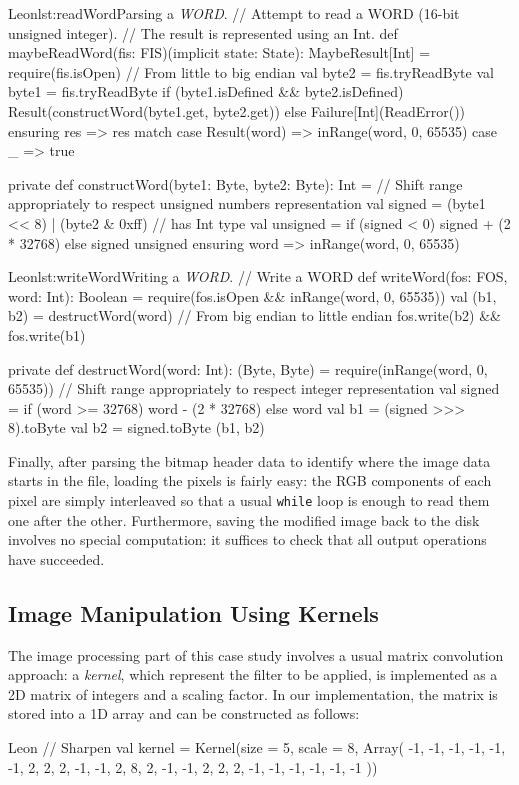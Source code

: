 \documentclass[a4paper,twoside]{article}
\newcommand{\InlineS}[1]{\lstinline[language=Leon]|#1|}
\begin{document}
\begin{Code}{Leon}{lst:readWord}{Parsing a \emph{WORD}.}
// Attempt to read a WORD (16-bit unsigned integer).
// The result is represented using an Int.
def maybeReadWord(fis: FIS)(implicit state: State): MaybeResult[Int] = {
  require(fis.isOpen)
  // From little to big endian
  val byte2 = fis.tryReadByte
  val byte1 = fis.tryReadByte
  if (byte1.isDefined && byte2.isDefined)
    Result(constructWord(byte1.get, byte2.get))
  else
    Failure[Int](ReadError())
} ensuring { res =>
  res match {
    case Result(word) => inRange(word, 0, 65535)
    case _            => true
  }
}

private def constructWord(byte1: Byte, byte2: Byte): Int = {
  // Shift range appropriately to respect unsigned numbers representation
  val signed   = (byte1 << 8) | (byte2 & 0xff) // has Int type
  val unsigned = if (signed < 0) signed + (2 * 32768) else signed
  unsigned
} ensuring { word => inRange(word, 0, 65535) }
\end{Code}

\begin{Code}{Leon}{lst:writeWord}{Writing a \emph{WORD}.}
// Write a WORD
def writeWord(fos: FOS, word: Int): Boolean = {
  require(fos.isOpen && inRange(word, 0, 65535))
  val (b1, b2) = destructWord(word)
  // From big endian to little endian
  fos.write(b2) && fos.write(b1)
}

private def destructWord(word: Int): (Byte, Byte) = {
  require(inRange(word, 0, 65535))
  // Shift range appropriately to respect integer representation
  val signed = if (word >= 32768) word - (2 * 32768) else word
  val b1 = (signed >>> 8).toByte
  val b2 = signed.toByte
  (b1, b2)
}
\end{Code}

\pagebreak
Finally, after parsing the bitmap header data to identify where the image data
starts in the file, loading the pixels is fairly easy: the RGB components of
each pixel are simply interleaved so that a usual \InlineS{while} loop is enough
to read them one after the other. Furthermore, saving the modified image back to
the disk involves no special computation: it suffices to check that all output
operations have succeeded.

\subsection{Image Manipulation Using Kernels}

The image processing part of this case study involves a usual matrix convolution
approach: a \emph{kernel}, which represent the filter to be applied, is
implemented as a 2D matrix of integers and a scaling factor. In our
implementation, the matrix is stored into a 1D array and can be constructed as
follows:
\begin{ShortCode}{Leon}
// Sharpen
val kernel = Kernel(size = 5, scale = 8, Array(
  -1, -1, -1, -1, -1,
  -1,  2,  2,  2, -1,
  -1,  2,  8,  2, -1,
  -1,  2,  2,  2, -1,
  -1, -1, -1, -1, -1
))
\end{ShortCode}
\end{document}

